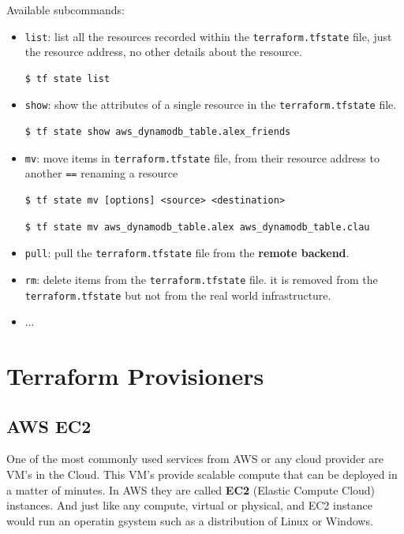 \documentclass{article}
\newenvironment{codetemplate}[1][]{%
  \mybasecolorbox[#1]
  \itshape
}{%
  \endmybasecolorbox
}
\begin{document}
Available subcommands:
\begin{itemize}
    \item \verb|list|: list all the resources recorded within the \verb|terraform.tfstate| file, just the resource address, no other details about the resource.
\begin{codetemplate}{}
\begin{verbatim}
$ tf state list
\end{verbatim}
\end{codetemplate}
    \item \verb|show|: show the attributes of a single resource in the \verb|terraform.tfstate| file.
\begin{codetemplate}{}
\begin{verbatim}
$ tf state show aws_dynamodb_table.alex_friends
\end{verbatim}
\end{codetemplate}
    \item \verb|mv|: move items in \verb|terraform.tfstate| file, from their resource address to another \verb|==| renaming a resource
\begin{codetemplate}{}
\begin{verbatim}
$ tf state mv [options] <source> <destination>
\end{verbatim}
\end{codetemplate}
\begin{codetemplate}{}
\begin{verbatim}
$ tf state mv aws_dynamodb_table.alex aws_dynamodb_table.clau
\end{verbatim}
\end{codetemplate}
    \item \verb|pull|: pull the \verb|terraform.tfstate| file from the \textbf{remote backend}.
    \item \verb|rm|: delete items from the \verb|terraform.tfstate| file. it is removed from the \verb|terraform.tfstate| but not from the real world infrastructure.
    \item ...
\end{itemize}

\section{Terraform Provisioners}

\subsection{AWS EC2}
One of the most commonly used services from AWS or any cloud provider are VM's in the Cloud. This VM's provide scalable compute that can be deployed in a matter of minutes. In AWS they are called \textbf{EC2} (Elastic Compute Cloud) instances. And just like any compute, virtual or physical, and EC2 instance would run an operatin gsystem such as a distribution of Linux or Windows. 
\end{document}
